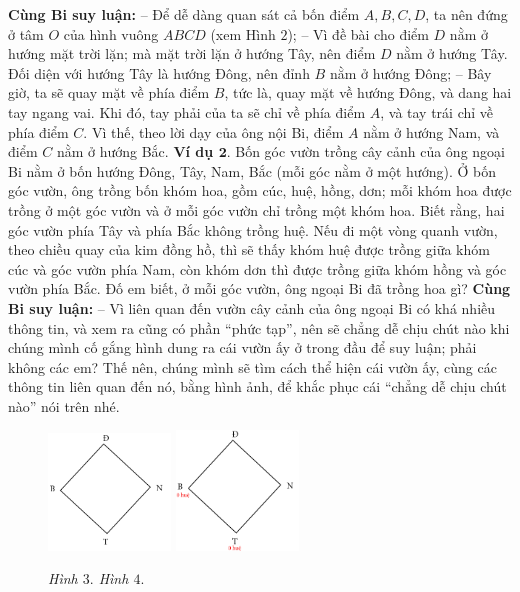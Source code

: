 	\textbf{Cùng Bi suy luận:}
	\vskip 0.1cm
	-- Để dễ dàng quan sát cả bốn điểm $A, B, C, D$, ta nên đứng ở tâm $O$ của hình vuông $ABCD$ (xem Hình $2$);
	\vskip 0.1cm
	-- Vì đề bài cho điểm $D$ nằm ở hướng mặt trời lặn; mà mặt trời lặn ở hướng Tây, nên điểm $D$ nằm ở hướng Tây. Đối diện với hướng Tây là hướng Đông, nên đỉnh $B$ nằm ở hướng Đông;
	\vskip 0.1cm
	-- Bây giờ, ta sẽ quay mặt về phía điểm $B$, tức là, quay mặt về hướng Đông, và dang hai tay ngang vai. Khi đó, tay phải của ta sẽ chỉ về phía điểm $A$, và tay trái chỉ về phía điểm $C$. Vì thế, theo lời dạy của ông nội Bi, điểm $A$ nằm ở hướng Nam, và điểm $C$ nằm ở hướng Bắc.
	\vskip 0.1cm
	\textbf{Ví dụ $\pmb2.$} Bốn góc vườn trồng cây cảnh của ông ngoại Bi nằm ở bốn hướng Đông, Tây, Nam, Bắc (mỗi góc nằm ở một hướng). Ở bốn góc vườn, ông trồng bốn khóm hoa, gồm cúc, huệ, hồng, dơn; mỗi khóm hoa được trồng ở một góc vườn và ở mỗi góc vườn chỉ trồng một khóm hoa. Biết rằng, hai góc vườn phía Tây và phía Bắc không trồng huệ. Nếu đi một vòng quanh vườn, theo chiều quay của kim đồng hồ, thì sẽ thấy khóm huệ được trồng giữa khóm cúc và góc vườn phía Nam, còn khóm dơn thì được trồng giữa khóm hồng và góc vườn phía Bắc. Đố em biết, ở mỗi góc vườn, ông ngoại Bi đã trồng hoa gì?
	\vskip 0.1cm
	\textbf{Cùng Bi suy luận:}
	\vskip 0.1cm
	-- Vì liên quan đến vườn cây cảnh của ông ngoại Bi có khá nhiều thông tin, và xem ra cũng có phần “phức tạp”, nên sẽ chẳng dễ chịu chút nào khi chúng mình cố gắng hình dung ra cái vườn ấy ở trong đầu để suy luận; phải không các em? Thế nên, chúng mình sẽ tìm cách thể hiện cái vườn ấy, cùng các thông tin liên quan đến nó, bằng hình ảnh, để khắc phục cái “chẳng dễ chịu chút nào” nói trên nhé.
	\vskip 0.1cm
	\begin{figure}
		\vspace*{-15pt}
		\centering
		\captionsetup{labelformat=empty, justification=centering}
		\includegraphics[width= 0.29\textwidth]{pic3}
		\includegraphics[width=0.29\textwidth]{pic4}
		\caption{\small\textit{Hình $3.$ \hspace*{50pt}Hình $4.$}}
		\vspace*{-15pt}
	\end{figure}
